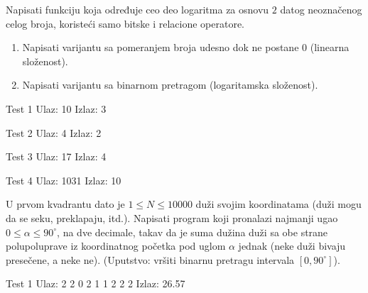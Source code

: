 \begin{Exercise}[label=405]
  Napisati funkciju koja određuje ceo deo logaritma za osnovu $2$
  datog neoznačenog celog broja, koristeći samo bitske i
  relacione operatore.
  \begin{enumerate}
  \item Napisati varijantu sa pomeranjem broja udesno dok ne postane 0
    (linearna složenost).
  \item Napisati varijantu sa binarnom pretragom (logaritamska složenost).
  \end{enumerate}
  
\begin{minitest}
\begin{test}{Test 1}
Ulaz:       10
Izlaz:      3
\end{test}
\end{minitest}
\begin{minitest}
\begin{test}{Test 2}
Ulaz:       4
Izlaz:      2
\end{test}
\end{minitest}
\begin{minitest}
\begin{test}{Test 3}
Ulaz:       17
Izlaz:      4
\end{test}
\end{minitest}

\begin{minitest}
\begin{test}{Test 4}
Ulaz:       1031
Izlaz:      10
\end{test}
\end{minitest}
  
\end{Exercise}

\begin{Exercise}[label=406]
  U prvom kvadrantu dato je $1 \leq N \leq 10000$ duži svojim
  koordinatama (duži mogu da se seku, preklapaju, itd.). Napisati
  program koji pronalazi najmanji ugao $0 \leq \alpha \leq 90^\circ$,
  na dve decimale, takav da je suma dužina duži sa obe strane
  polupoluprave iz koordinatnog početka pod uglom $\alpha$ jednak
  (neke duži bivaju presečene, a neke ne). (Uputstvo: vršiti
  binarnu pretragu intervala $[0, 90^\circ]$).
  
\begin{minitest}
\begin{test}{Test 1}
Ulaz:
2
2 0 2 1
1 2 2 2
Izlaz:
26.57 
\end{test}
\end{minitest}
  
\end{Exercise}


